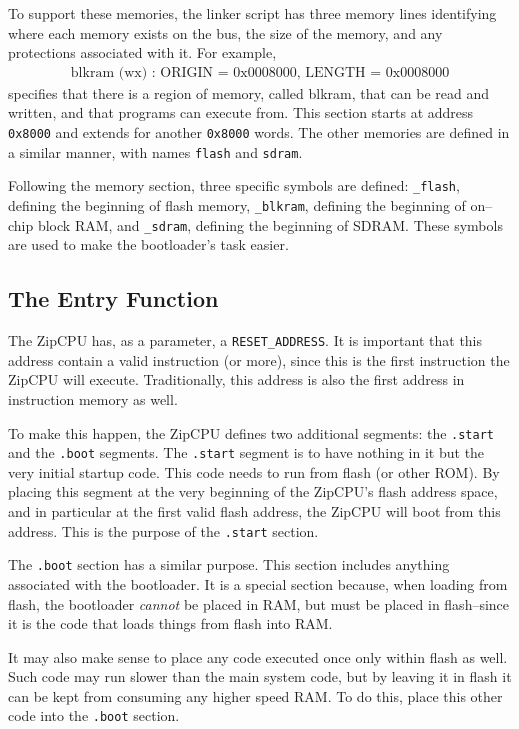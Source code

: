\documentclass{gqtekspec}
\begin{document}
To support these memories, the linker script has three memory lines identifying
where each memory exists on the bus, the size of the memory, and any protections
associated with it.  For example,
\begin{eqnarray*}
\mbox{blkram (wx) : ORIGIN = 0x0008000, LENGTH = 0x0008000}
\end{eqnarray*}
specifies that there is a region of memory, called blkram, that can be read and
written, and that programs can execute from.  This section starts at address
{\tt 0x8000} and extends for another {\tt 0x8000} words.  The other memories
are defined in a similar manner, with names {\tt flash} and {\tt sdram}.

Following the memory section, three specific symbols are defined:
	{\tt \_flash}, defining the beginning of flash memory,
	{\tt \_blkram}, defining the beginning of on--chip block RAM,
	and
	{\tt \_sdram}, defining the beginning of SDRAM.
These symbols are used to make the bootloader's task easier.

\subsection{The Entry Function}\label{sec:ld-entry}
The ZipCPU has, as a parameter, a {\tt RESET\_ADDRESS}.  It is important
that this address contain a valid instruction (or more), since this is the
first instruction the ZipCPU will execute.  Traditionally, this address is also
the first address in instruction memory as well.

To make this happen, the ZipCPU defines two additional segments: the
{\tt .start} and the {\tt .boot} segments.  The {\tt  .start} segment is to 
have nothing in it but the very initial startup code.  This code needs to run 
from flash (or other ROM).  By placing this segment at the very beginning of
the ZipCPU's flash address space, and in particular at the first valid flash
address, the ZipCPU will boot from this address.  This is the purpose of the
{\tt .start} section.

The {\tt .boot} section has a similar purpose.  This section includes anything
associated with the bootloader.  It is a special section because, when loading
from flash, the bootloader {\em cannot} be placed in RAM, but must be placed
in flash--since it is the code that loads things from flash into RAM.

It may also make sense to place any code executed once only within flash as
well.  Such code may run slower than the main system code, but by leaving it in
flash it can be kept from consuming any higher speed RAM.  To do this, place
this other code into the {\tt .boot} section.
\end{document}
